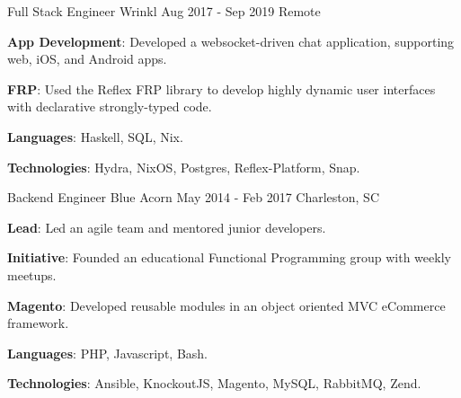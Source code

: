 \begin{cventries}
  \cventry
    {Full Stack Engineer}
    {Wrinkl}
    {Aug 2017 - Sep 2019}
    {Remote}
    {
      \begin{cvitems}
        \item {\color{graytext}\textbf{App Development}}: Developed a
          websocket-driven chat application, supporting
          web, iOS, and Android apps.
        \item {\color{graytext}\textbf{FRP}}: Used the Reflex FRP library to
          develop highly dynamic user interfaces with declarative strongly-typed
          code.
        \item {\color{graytext}\textbf{Languages}}: Haskell, SQL, Nix.
        \item {\color{graytext}\textbf{Technologies}}: Hydra, NixOS, Postgres,
          Reflex-Platform, Snap.
      \end{cvitems}
    }


  \cventry
    {Backend Engineer} %
    {Blue Acorn} %
    {May 2014 - Feb 2017} %
    {Charleston, SC} %
    {
      \begin{cvitems} %
        \item {\color{graytext}\textbf{Lead}}: Led an agile team
          and mentored junior developers.
        \item {\color{graytext}\textbf{Initiative}}: Founded an
          educational Functional Programming group with weekly meetups.
        \item {\color{graytext}\textbf{Magento}}: Developed reusable modules in
          an object oriented MVC eCommerce framework.
        \item {\color{graytext}\textbf{Languages}}: PHP, Javascript, Bash.
        \item {\color{graytext}\textbf{Technologies}}: Ansible, KnockoutJS, Magento,
          MySQL, RabbitMQ, Zend.
      \end{cvitems}
    }

\end{cventries}
